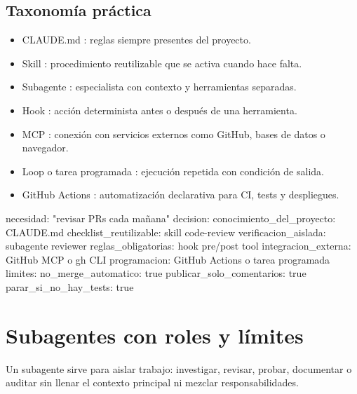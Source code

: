 \documentclass[11pt,a4paper]{book}
\begin{document}
\section{Taxonomía práctica}
\begin{itemize}\item CLAUDE.md : reglas siempre presentes del proyecto.\end{itemize}
\begin{itemize}\item Skill : procedimiento reutilizable que se activa cuando hace falta.\end{itemize}
\begin{itemize}\item Subagente : especialista con contexto y herramientas separadas.\end{itemize}
\begin{itemize}\item Hook : acción determinista antes o después de una herramienta.\end{itemize}
\begin{itemize}\item MCP : conexión con servicios externos como GitHub, bases de datos o navegador.\end{itemize}
\begin{itemize}\item Loop o tarea programada : ejecución repetida con condición de salida.\end{itemize}
\begin{itemize}\item GitHub Actions : automatización declarativa para CI, tests y despliegues.\end{itemize}
\begin{codebox}
necesidad: "revisar PRs cada mañana"
decision:
  conocimiento_del_proyecto: CLAUDE.md
  checklist_reutilizable: skill code-review
  verificacion_aislada: subagente reviewer
  reglas_obligatorias: hook pre/post tool
  integracion_externa: GitHub MCP o gh CLI
  programacion: GitHub Actions o tarea programada
limites:
  no_merge_automatico: true
  publicar_solo_comentarios: true
  parar_si_no_hay_tests: true
\end{codebox}
\chapter{Subagentes con roles y límites}
Un subagente sirve para aislar trabajo: investigar, revisar, probar, documentar o auditar sin llenar el contexto principal ni mezclar responsabilidades.
\end{document}
